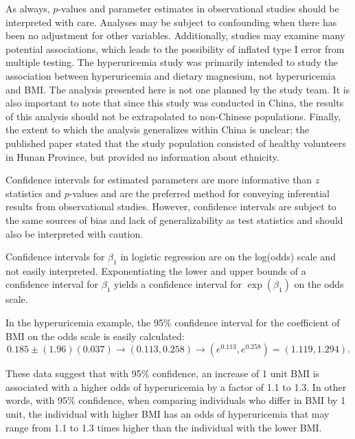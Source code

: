 As always, $p$-values and parameter estimates in observational studies should be interpreted with care.  Analyses may be subject to confounding when there has been no adjustment for other variables. Additionally, studies may examine many potential associations, which leads to the possibility of inflated type I error from multiple testing. The hyperuricemia study was primarily intended to study the association between hyperuricemia and dietary magnesium, not hyperuricemia and BMI. The analysis presented here is not one planned by the study team. It is also important to note that since this study was conducted in China, the results of this analysis should not be extrapolated to non-Chinese populations. Finally, the extent to which the analysis generalizes within China is unclear; the published paper stated that the study population consisted of healthy volunteers in Hunan Province, but provided no information about ethnicity.

Confidence intervals for estimated parameters are more informative than $z$ statistics and $p$-values and are the preferred method for conveying inferential results from observational studies.  However, confidence intervals are subject to the same sources of bias and lack of generalizability as test statistics and should also be interpreted with caution.

Confidence intervals for $\beta_1$ in logistic regression are on the log(odds) scale and not easily interpreted. Exponentiating the lower and upper bounds of a confidence interval for $\beta_1$ yields a confidence interval for $\exp(\beta_1)$ on the odds scale.

In the hyperuricemia example, the 95\% confidence interval for the coefficient of BMI on the odds scale is easily calculated:
\[
  0.185 \pm (1.96)(0.037) \longrightarrow (0.113, 0.258) \longrightarrow (e^{0.113}, e^{0.258}) = (1.119, 1.294).
\]

These data suggest that with 95\% confidence, an increase of 1 unit BMI is associated with a higher odds of hyperuricemia by a factor of 1.1 to 1.3. In other words, with 95\% confidence, when comparing individuals who differ in BMI by 1 unit, the individual with higher BMI has an odds of hyperuricemia that may range from 1.1 to 1.3 times higher than the individual with the lower BMI.


